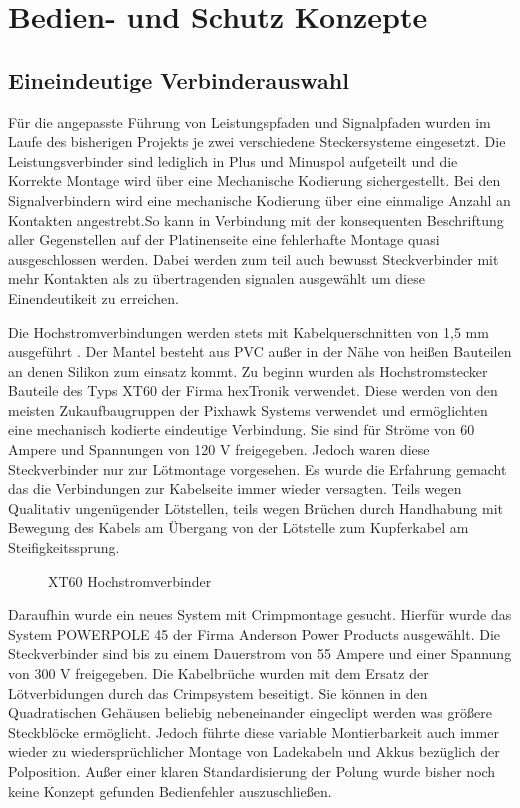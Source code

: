 \section{Bedien- und Schutz Konzepte}

\subsection{Eineindeutige Verbinderauswahl}

Für die angepasste Führung von Leistungspfaden und Signalpfaden wurden im Laufe des bisherigen Projekts je zwei verschiedene Steckersysteme eingesetzt.
Die Leistungsverbinder sind lediglich in Plus und Minuspol aufgeteilt und die Korrekte Montage wird über eine Mechanische Kodierung sichergestellt.
Bei den Signalverbindern wird eine mechanische Kodierung über eine einmalige Anzahl an Kontakten angestrebt.So kann in Verbindung mit der konsequenten Beschriftung aller Gegenstellen auf der Platinenseite eine fehlerhafte Montage quasi ausgeschlossen werden. Dabei werden zum teil auch bewusst Steckverbinder mit mehr Kontakten als zu übertragenden signalen ausgewählt um diese Einendeutikeit zu erreichen.

Die Hochstromverbindungen werden stets mit Kabelquerschnitten von 1,5 mm ausgeführt \cite{DIN_VDE_0298}. Der Mantel besteht aus PVC außer in der Nähe von heißen Bauteilen an denen Silikon zum einsatz kommt.
Zu beginn wurden als Hochstromstecker Bauteile des Typs XT60 der Firma hexTronik verwendet.
Diese werden von den meisten Zukaufbaugruppen der Pixhawk Systems verwendet und ermöglichten eine mechanisch kodierte eindeutige Verbindung.
Sie sind für Ströme von 60 Ampere und Spannungen von 120 V freigegeben.
Jedoch waren diese Steckverbinder nur zur Lötmontage vorgesehen. Es wurde die Erfahrung gemacht das die Verbindungen zur Kabelseite immer wieder versagten. Teils wegen Qualitativ ungenügender Lötstellen, teils wegen Brüchen durch Handhabung mit Bewegung des Kabels am Übergang von der Lötstelle zum Kupferkabel am Steifigkeitssprung.


\begin{figure}[H]
\centering
{}
\caption{XT60 Hochstromverbinder} 
\label{fig:XT60 Hochstromverbinder}
\end{figure}

Daraufhin wurde ein neues System mit Crimpmontage gesucht.
Hierfür wurde das System POWERPOLE 45 der Firma Anderson Power Products ausgewählt. Die Steckverbinder sind bis zu einem Dauerstrom von 55 Ampere und einer Spannung von 300 V freigegeben.
Die Kabelbrüche wurden mit dem Ersatz der Lötverbidungen durch das Crimpsystem beseitigt. Sie können in den Quadratischen Gehäusen beliebig nebeneinander eingeclipt werden was größere Steckblöcke ermöglicht. Jedoch führte diese variable Montierbarkeit auch immer wieder zu wiedersprüchlicher Montage von Ladekabeln und Akkus bezüglich der Polposition.
Außer einer klaren Standardisierung der Polung wurde bisher noch keine Konzept gefunden Bedienfehler auszuschließen. 

